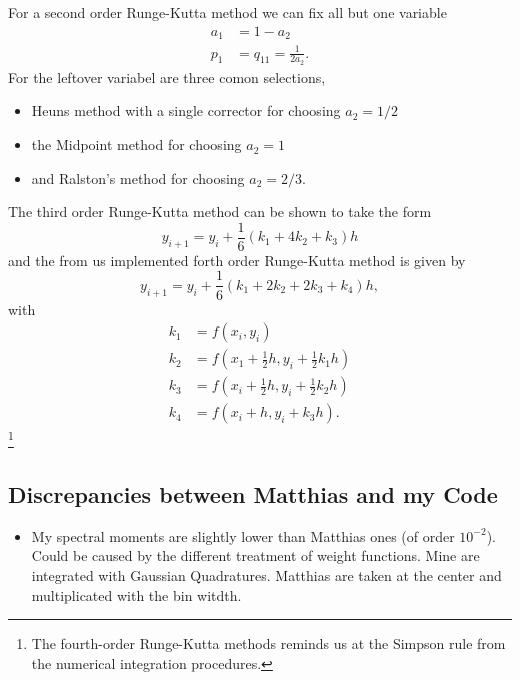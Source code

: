 For a second order Runge-Kutta method we can fix all but one variable
\begin{align}
	a_1 &= 1 - a_2 \\
	p_1 &= q_{11} = \frac{1}{2 a_2}.
\end{align}
For the leftover variabel are three comon selections, 
\begin{itemize}
	\item Heuns method with a single corrector for choosing $a_2 = 1/2$
	\item the Midpoint method for choosing $a_2 =  1$
	\item and Ralston's method for choosing $a_2 = 2/3$.
\end{itemize}
The third order Runge-Kutta method can be shown to take the form
\begin{equation}
	y_{i+1} = y_i + \frac{1}{6} ( k_1 + 4 k_2 + k_3 ) h
\end{equation}
and the from us implemented forth order Runge-Kutta method is given by
\begin{equation}
	y_{i+1} = y_i + \frac{1}{6} ( k_1 + 2 k_2 + 2 k_3 + k_4) h,
\end{equation}
with 
\begin{align}
	k_1 &= f(x_i, y_i) \\
	k_2 &= f\left(x_1 + \frac{1}{2} h, y_i + \frac{1}{2} k_1 h \right) \\
	k_3 &= f\left(x_i + \frac{1}{2} h, y_i + \frac{1}{2} k_2 h \right) \\
	k_4 &= f(x_i + h, y_i + k_3 h).
\end{align}
\footnote{The fourth-order Runge-Kutta methods reminds us at the Simpson rule from the numerical integration procedures.}

\subsection{Discrepancies between Matthias and my Code}
\begin{itemize}
	\item My spectral moments are slightly lower than Matthias ones (of order $10^{-2}$). Could be caused by the different treatment of weight functions. Mine are integrated with Gaussian Quadratures. Matthias are taken at the center and multiplicated with the bin witdth.
\end{itemize}
